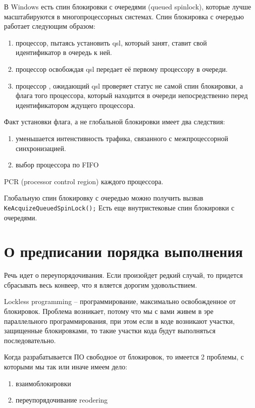 В Windows есть спин блокировки с очередями (queued spinlock), которые лучше масштабируются в многопроцессорных системах. Спин блокировка с очередью работает следующим образом: 
\begin{enumerate}
	\item процессор, пытаясь установить qsl, который занят, ставит свой идентификатор в очередь к ней.
	\item процессор освобождая qsl передает её первому процессору в очереди.
	\item процессор , ожидающий qsl проверяет статус не самой спин блокировки, а флага того процессора,  который находится в очереди непосредственно перед идентификатором ждущего процессора. 
\end{enumerate}

Факт установки флага, а не глобальной блокировки имеет два следствия:
\begin{enumerate}
	\item уменьшается интенстивность трафика, связанного с межпроцессорной  синхронизацией.
	\item выбор процессора по FIFO
\end{enumerate}

PCR (processor control region) каждого процессора. 

Глобальную спин блокировку с очередью можно получить вызвав \verb|KeAcquizeQueuedSpinLock();| 
Есть еще внутристековые спин блокировки с очередями.

\section{О предписании порядка выполнения}

Речь идет о переупорядочивания. Если произойдет редкий случай, то придется сбрасывать весь конвеер, что я вляется дорогим удовольствием.

 

Lockless programming – программирование, максимально освобожденное от блокировок. Проблема возникает, потому что мы с вами живем в эре параллельного программирования, при этом  если в коде возникают участки, защищенные блокировками, то такие участки кода будут выполняться последовательно.

Когда разрабатывается ПО свободное от блокировок, то имеется 2 проблемы, с которыми мы так или иначе имеем дело:
\begin{enumerate}
	\item взаимоблокировки
	\item переупорядочивание reodering
\end{enumerate}

